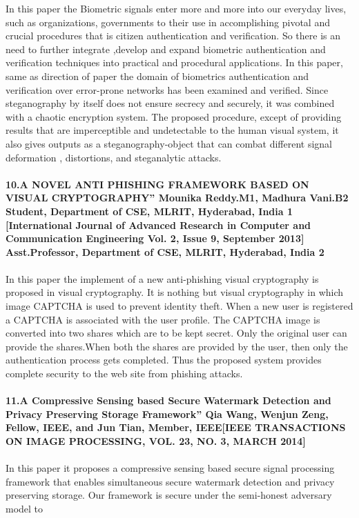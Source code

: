 \documentclass[12pt]{extreport}
\begin{document}
In this paper the Biometric signals enter more and more into our everyday lives, such as organizations, governments to their use in accomplishing pivotal and crucial
procedures that is citizen authentication and verification. So there is an need to further integrate ,develop and expand biometric authentication and verification techniques into practical and procedural applications. In this paper, same as direction of paper  the domain of biometrics authentication and verification over error-prone networks has been examined and verified. Since steganography by itself does
not ensure secrecy and securely, it was combined with a chaotic encryption system. The proposed procedure, except of providing results that are imperceptible and undetectable to the human visual system, it also gives outputs as a steganography-object that can combat different signal deformation , distortions, and steganalytic attacks.\\\\
\textbf{10.A NOVEL ANTI PHISHING FRAMEWORK BASED ON VISUAL CRYPTOGRAPHY”
Mounika Reddy.M1, Madhura Vani.B2 Student, Department of CSE, MLRIT, Hyderabad, India 1 [International Journal of Advanced Research
in Computer and Communication Engineering Vol. 2, Issue 9, September 2013]
Asst.Professor, Department of CSE, MLRIT, Hyderabad, India 2}\\\\
In this paper the implement  of a new anti-phishing visual cryptography is proposed in visual cryptography. It is nothing but visual cryptography in which image CAPTCHA is used to prevent identity theft. When a new user is registered a CAPTCHA is associated with the user profile. The CAPTCHA image is converted into two shares which are to be kept secret. Only the original user can provide the shares.When both the shares are provided by the user, then only the authentication process gets completed. Thus the
proposed system provides complete security to the web site from phishing attacks.\\\\
\textbf{11.A Compressive Sensing based Secure Watermark Detection and Privacy Preserving Storage Framework” Qia Wang, Wenjun Zeng, Fellow, IEEE, and Jun Tian, Member, IEEE[IEEE TRANSACTIONS ON IMAGE PROCESSING, VOL. 23, NO. 3, MARCH 2014]}\\\\
 In this paper it proposes a compressive sensing based secure signal processing framework that enables simultaneous secure watermark detection and privacy preserving storage. Our framework is secure under the semi-honest adversary model to
\end{document}
